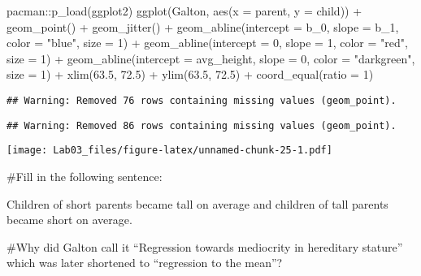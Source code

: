 \documentclass[
]{article}
\newenvironment{Shaded}{\begin{snugshade}}{\end{snugshade}}
\newcommand{\AttributeTok}[1]{\textcolor[rgb]{0.77,0.63,0.00}{#1}}
\newcommand{\DecValTok}[1]{\textcolor[rgb]{0.00,0.00,0.81}{#1}}
\newcommand{\FloatTok}[1]{\textcolor[rgb]{0.00,0.00,0.81}{#1}}
\newcommand{\FunctionTok}[1]{\textcolor[rgb]{0.00,0.00,0.00}{#1}}
\newcommand{\NormalTok}[1]{#1}
\newcommand{\SpecialCharTok}[1]{\textcolor[rgb]{0.00,0.00,0.00}{#1}}
\newcommand{\StringTok}[1]{\textcolor[rgb]{0.31,0.60,0.02}{#1}}
\begin{document}
\begin{Shaded}
\begin{Highlighting}[]
\NormalTok{pacman}\SpecialCharTok{::}\FunctionTok{p\_load}\NormalTok{(ggplot2)}
\FunctionTok{ggplot}\NormalTok{(Galton, }\FunctionTok{aes}\NormalTok{(}\AttributeTok{x =}\NormalTok{ parent, }\AttributeTok{y =}\NormalTok{ child)) }\SpecialCharTok{+} 
  \FunctionTok{geom\_point}\NormalTok{() }\SpecialCharTok{+} 
  \FunctionTok{geom\_jitter}\NormalTok{() }\SpecialCharTok{+}
  \FunctionTok{geom\_abline}\NormalTok{(}\AttributeTok{intercept =}\NormalTok{ b\_0, }\AttributeTok{slope =}\NormalTok{ b\_1, }\AttributeTok{color =} \StringTok{"blue"}\NormalTok{, }\AttributeTok{size =} \DecValTok{1}\NormalTok{) }\SpecialCharTok{+}
  \FunctionTok{geom\_abline}\NormalTok{(}\AttributeTok{intercept =} \DecValTok{0}\NormalTok{, }\AttributeTok{slope =} \DecValTok{1}\NormalTok{, }\AttributeTok{color =} \StringTok{"red"}\NormalTok{, }\AttributeTok{size =} \DecValTok{1}\NormalTok{) }\SpecialCharTok{+}
  \FunctionTok{geom\_abline}\NormalTok{(}\AttributeTok{intercept =}\NormalTok{ avg\_height, }\AttributeTok{slope =} \DecValTok{0}\NormalTok{, }\AttributeTok{color =} \StringTok{"darkgreen"}\NormalTok{, }\AttributeTok{size =} \DecValTok{1}\NormalTok{) }\SpecialCharTok{+}
  \FunctionTok{xlim}\NormalTok{(}\FloatTok{63.5}\NormalTok{, }\FloatTok{72.5}\NormalTok{) }\SpecialCharTok{+} 
  \FunctionTok{ylim}\NormalTok{(}\FloatTok{63.5}\NormalTok{, }\FloatTok{72.5}\NormalTok{) }\SpecialCharTok{+}
  \FunctionTok{coord\_equal}\NormalTok{(}\AttributeTok{ratio =} \DecValTok{1}\NormalTok{)}
\end{Highlighting}
\end{Shaded}

\begin{verbatim}
## Warning: Removed 76 rows containing missing values (geom_point).
\end{verbatim}

\begin{verbatim}
## Warning: Removed 86 rows containing missing values (geom_point).
\end{verbatim}

\texttt{[image: Lab03\_files/figure-latex/unnamed-chunk-25-1.pdf]}

\#Fill in the following sentence:

Children of short parents became tall on average and children of tall
parents became short on average.

\#Why did Galton call it ``Regression towards mediocrity in hereditary
stature'' which was later shortened to ``regression to the mean''?
\end{document}
